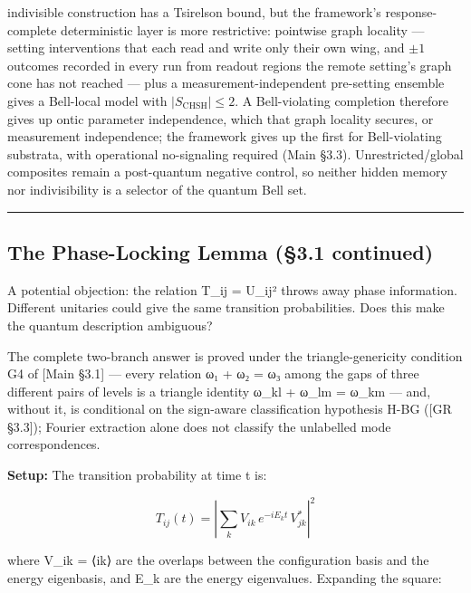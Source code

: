 \documentclass[
]{article}
\begin{document}
\begin{itemize}
  indivisible construction has a Tsirelson bound, but the framework's
  response-complete deterministic layer is more restrictive: pointwise
  graph locality --- setting interventions that each read and write only
  their own wing, and \(\pm1\) outcomes recorded in every run from
  readout regions the remote setting's graph cone has not reached ---
  plus a measurement-independent pre-setting ensemble gives a Bell-local
  model with \(|S_{\mathrm{CHSH}}|\le2\). A Bell-violating completion
  therefore gives up ontic parameter independence, which that graph
  locality secures, or measurement independence; the framework gives up
  the first for Bell-violating substrata, with operational no-signaling
  required (Main §3.3). Unrestricted/global composites remain a
  post-quantum negative control, so neither hidden memory nor
  indivisibility is a selector of the quantum Bell set.
\end{itemize}

\begin{center}\rule{0.5\linewidth}{0.5pt}\end{center}

\hypertarget{the-phase-locking-lemma-3.1-continued}{%
\subsection{The Phase-Locking Lemma (§3.1
continued)}\label{the-phase-locking-lemma-3.1-continued}}

A potential objection: the relation T\_ij = \textbar U\_ij\textbar²
throws away phase information. Different unitaries could give the same
transition probabilities. Does this make the quantum description
ambiguous?

The complete two-branch answer is proved under the triangle-genericity
condition G4 of {[}Main §3.1{]} --- every relation ω₁ + ω₂ = ω₃ among
the gaps of three different pairs of levels is a triangle identity ω\_kl
+ ω\_lm = ω\_km --- and, without it, is conditional on the sign-aware
classification hypothesis H-BG ({[}GR §3.3{]}); Fourier extraction alone
does not classify the unlabelled mode correspondences.

\textbf{Setup:} The transition probability at time t is:

\[T_{ij}(t) = \left|\sum_k V_{ik} \, e^{-iE_k t} \, V_{jk}^*\right|^2\]

where V\_ik = ⟨i\textbar k⟩ are the overlaps between the configuration
basis and the energy eigenbasis, and E\_k are the energy eigenvalues.
Expanding the square:
\end{document}
